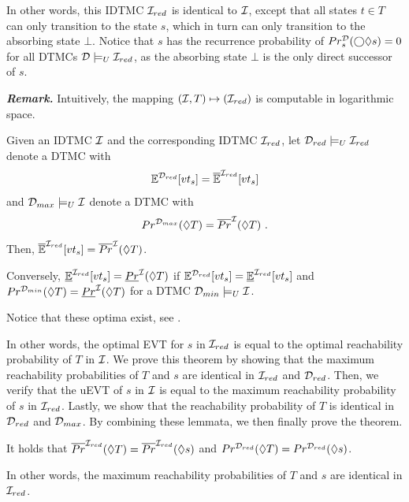 In other words, this IDTMC $\mathcal{I}_{red}$ is identical to $\mathcal{I}$, except that all states $t\in T$ can only transition to the state $s$, which in turn can only transition to the absorbing state $\bot$. Notice that $s$ has the recurrence probability of $Pr_s^{\mathcal{D}}(\bigcirc\lozenge s) = 0$ for all DTMCs $\mathcal{D} \models_U \mathcal{I}_{red}$, as the absorbing state $\bot$ is the only direct successor of $s$.

\emph{\textbf{Remark.}} Intuitively, the mapping $(\mathcal{I},T)\mapsto(\mathcal{I}_{red})$ is computable in logarithmic space.

\begin{theorem}\label{th:reduction_computes_reach_prob}
    Given an IDTMC $\mathcal{I}$ and the corresponding IDTMC $\mathcal{I}_{red}$, let $\mathcal{D}_{red}\models_U \mathcal{I}_{red}$ denote a DTMC with 
    \[\mathbb{E}^{\mathcal{D}_{red}}[vt_s] = \mathbb{\overline{E}}^{\mathcal{I}_{red}}[vt_s]\] 
    and $\mathcal{D}_{max} \models_U \mathcal{I}$ denote a DTMC with 
    \[Pr^{\mathcal{D}_{max}}(\lozenge T) = \overline{Pr}^{\mathcal{I}}(\lozenge T)\ .\] 
    Then, $\mathbb{\overline{E}}^{\mathcal{I}_{red}}[vt_s] = \overline{Pr}^{\mathcal{I}}(\lozenge T)$.

    Conversely, $\mathbb{\underline{E}}^{\mathcal{I}_{red}}[vt_s] = \underline{Pr}^{\mathcal{I}}(\lozenge T)$ if $\mathbb{E}^{\mathcal{D}_{red}}[vt_s] = \mathbb{\underline{E}}^{\mathcal{I}_{red}}[vt_s]$ and $Pr^{\mathcal{D}_{min}}(\lozenge T) = \underline{Pr}^{\mathcal{I}}(\lozenge T)$ for a DTMC $\mathcal{D}_{min} \models_U \mathcal{I}$.
\end{theorem}
Notice that these optima exist, see .

In other words, the optimal EVT for $s$ in $\mathcal{I}_{red}$ is equal to the optimal reachability probability of $T$ in $\mathcal{I}$.
We prove this theorem by showing that the maximum reachability probabilities of $T$ and $s$ are identical in $\mathcal{I}_{red}$ and $\mathcal{D}_{red}$. %
Then, we verify that the uEVT of $s$ in $\mathcal{I}$ is equal to the maximum reachability probability of $s$ in $\mathcal{I}_{red}$. Lastly, we show that the reachability probability of $T$ is identical in $\mathcal{D}_{red}$ and $\mathcal{D}_{max}$. By combining these lemmata, we then finally prove the theorem.


\begin{lemma}\label{lem:equal_reach_prob_for_state_extension}
    It holds that $\overline{Pr}^{\mathcal{I}_{red}}(\lozenge T) = \overline{Pr}^{\mathcal{I}_{red}}(\lozenge s)$ and $Pr^{\mathcal{D}_{red}}(\lozenge T) = Pr^{\mathcal{D}_{red}}(\lozenge s)$.
\end{lemma}
In other words, the maximum reachability probabilities of $T$ and $s$ are identical in $\mathcal{I}_{red}$.


